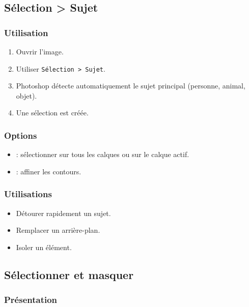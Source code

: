 \subsection{Sélection > Sujet}

\subsubsection{Utilisation}

\begin{enumerate}
    \item Ouvrir l'image.
    \item Utiliser \texttt{Sélection > Sujet}.
    \item Photoshop détecte automatiquement le sujet principal (personne, animal, objet).
    \item Une sélection est créée.
\end{enumerate}

\subsubsection{Options}

\begin{itemize}
    \item {} : sélectionner sur tous les calques ou sur le calque actif.
    \item {} : affiner les contours.
\end{itemize}

\subsubsection{Utilisations}

\begin{itemize}
    \item Détourer rapidement un sujet.
    \item Remplacer un arrière-plan.
    \item Isoler un élément.
\end{itemize}

\subsection{Sélectionner et masquer}

\subsubsection{Présentation}

